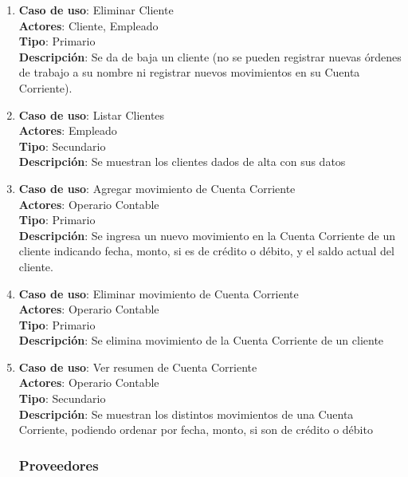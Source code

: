 \documentclass[12pt]{extarticle}
\begin{document}
\begin{spacing}{1.2}
\begin{enumerate}
        \item 	\textbf{Caso de uso}: Eliminar Cliente\\
                \textbf{Actores}: Cliente, Empleado\\
                \textbf{Tipo}: Primario\\
                \textbf{Descripción}: Se da de baja un cliente (no se pueden registrar nuevas órdenes de trabajo a su nombre ni registrar nuevos movimientos en su Cuenta Corriente).

        \item 	\textbf{Caso de uso}: Listar Clientes\\
                \textbf{Actores}: Empleado\\
                \textbf{Tipo}: Secundario\\
                \textbf{Descripción}: Se muestran los clientes dados de alta con sus datos

        \item 	\textbf{Caso de uso}: Agregar movimiento de Cuenta Corriente\\
                \textbf{Actores}: Operario Contable\\
                \textbf{Tipo}: Primario\\
                \textbf{Descripción}: Se ingresa un nuevo movimiento en la Cuenta Corriente de un cliente indicando fecha, monto, si es de crédito o débito, y el saldo actual del cliente.

        \item   \textbf{Caso de uso}: Eliminar movimiento de Cuenta Corriente\\
                \textbf{Actores}: Operario Contable\\
                \textbf{Tipo}: Primario\\
                \textbf{Descripción}: Se elimina movimiento de la Cuenta Corriente de un cliente

        \item   \textbf{Caso de uso}: Ver resumen de Cuenta Corriente\\
                \textbf{Actores}: Operario Contable\\
                \textbf{Tipo}: Secundario\\
                \textbf{Descripción}: Se muestran los distintos movimientos de una Cuenta Corriente, podiendo ordenar por fecha, monto, si son de crédito o débito



        \subsubsection{Proveedores}




\end{enumerate}
\end{spacing}
\end{document}
